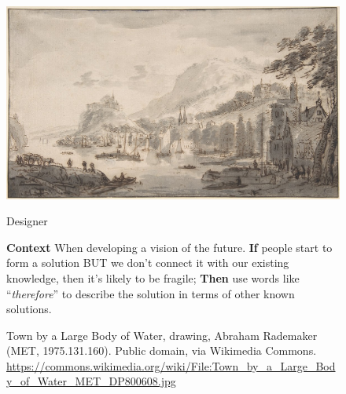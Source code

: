 \documentclass{article}
\begin{document}
\pagestyle{empty}
\thispagestyle{empty}
\pagecolor{dimgray!30}

\begin{figure}[h]
\begin{adjustbox}{minipage=[c]{\textwidth-10mm},margin= 5mm 35mm 5mm 27mm, frame=1pt, bgcolor=almond,env=center}%
\begin{center}
\includegraphics[trim=0mm 0mm 0mm 0mm, clip,width=.7\paperwidth]{water_town.jpg}
\end{center}

\begin{center}
\begin{minipage}[t]{0.7\paperwidth}

\medskip
{\huge Designer}
\bigskip

\Large\raggedright
\textbf{Context} When developing a vision of the future.\newline
\textbf{If} people start to form a solution BUT we don’t connect it with our existing knowledge, then it’s likely to be fragile;\newline
\textbf{Then} use words like “\emph{therefore}” to describe the solution in terms of other known solutions.
\end{minipage}
\end{center}
\caption*{Town by a Large Body of Water, drawing, Abraham Rademaker (MET, 1975.131.160). Public domain, via Wikimedia Commons.\newline
\url{https://commons.wikimedia.org/wiki/File:Town_by_a_Large_Body_of_Water_MET_DP800608.jpg}}
\end{adjustbox}
\end{figure}
\end{document}
